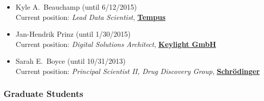 \documentclass[10pt]{article}
\begin{document}
\begin{itemize}
  \item Kyle A.~Beauchamp (until 6/12/2015)\\
  Current position: \emph{Lead Data Scientist}, \href{http://www.tempus.com}{{\bf Tempus}}
  
  \item Jan-Hendrik Prinz (until 1/30/2015)\\
  Current position: \emph{Digital Solutions Architect}, \href{http://www.keylight.de/}{{\bf Keylight GmbH}}
  
  \item Sarah E.~Boyce (until 10/31/2013)\\
  Current position: \emph{Principal Scientist II, Drug Discovery Group},  \href{http://www.schrodinger.com}{{\bf Schr\"{o}dinger}}

\end{itemize}

\subsubsection*{Graduate Students}
\end{document}
